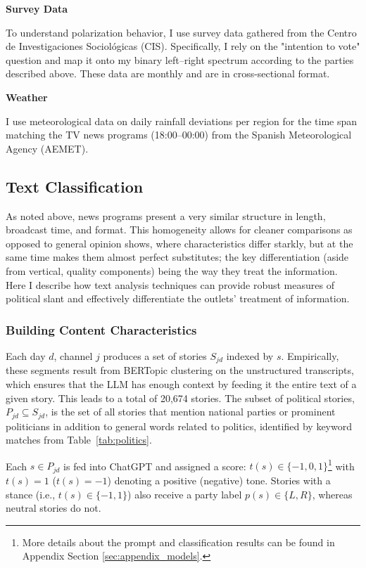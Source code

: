 \documentclass[12pt]{article}
\begin{document}
	
	\textbf{Survey Data}
	
	To understand polarization behavior, I use survey data gathered from the Centro de Investigaciones Sociológicas (CIS). Specifically, I rely on the "intention to vote" question and map it onto my binary left–right spectrum according to the parties described above. These data are monthly and are in cross-sectional format.
	
	\textbf{Weather}
	
	I use meteorological data on daily rainfall deviations per region for the time span matching the TV news programs (18:00–00:00) from the Spanish Meteorological Agency (AEMET).
	
	
	
	
	
	\subsection{Text Classification}
	
	As noted above,  news programs present a very similar structure in length, broadcast time, and format. This homogeneity allows for cleaner comparisons as opposed to general opinion shows, where characteristics differ starkly, but at the same time makes them almost perfect substitutes; the key differentiation (aside from vertical, quality components) being the way they treat the information. Here I describe how text analysis techniques can provide robust measures of political slant and effectively differentiate the outlets' treatment of  information. 
	
	
	
	\subsubsection*{Building Content Characteristics}
	
	Each day \(d\), channel \(j\) produces a set of stories \(S_{jd}\) indexed by \(s\). Empirically, these segments result from BERTopic clustering on the unstructured transcripts, which ensures that the LLM has enough context by feeding it the entire text of a given story. This leads to a total of 20,674 stories. The subset of political stories, \({P}_{jd}\subseteq S_{jd}\), is the set of all stories that mention national parties or prominent politicians in addition to general words related to politics, identified by keyword matches from Table~\ref{tab:politics}.
	
	Each \(s\in {P}_{jd}\) is fed into ChatGPT and  assigned a score: \({t}(s)\in\{-1,0,1\}\)\footnote{More details about the prompt and classification results can be found in Appendix Section \ref{sec:appendix_models}.} with ${t}(s)=1$ (${t}(s)=-1$) denoting a positive (negative) tone. Stories with a stance (i.e., \({t}(s)\in\{-1,1\}\)) also receive a party label \({p}(s)\in\{L,R\}\), whereas neutral stories do not. 
	
\end{document}
